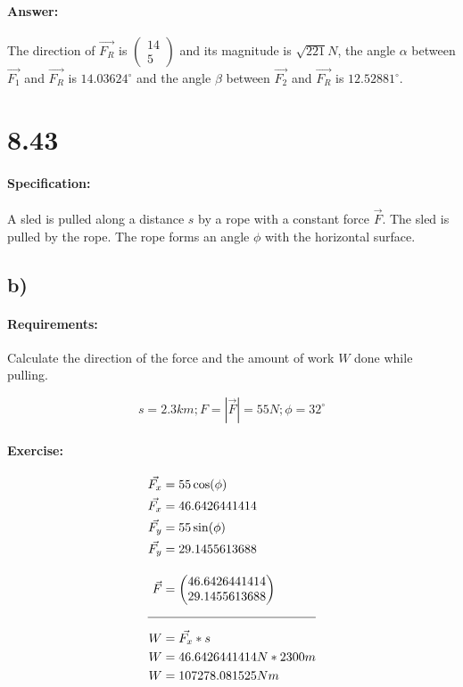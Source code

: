 \documentclass{article}
\begin{document}
\paragraph{Answer:}
The direction of $\vec{F_R}$ is $\begin{pmatrix}
   14 \\ 
   5
\end{pmatrix}$ and its magnitude is $\sqrt{221}N$, the angle $\alpha$ between $\vec{F_1}$ 
and $\vec{F_R}$ is $14.03624^\circ$ and the angle $\beta$ between $\vec{F_2}$ and $\vec{F_R}$ 
is $12.52881^\circ$.

\pagebreak

\section{8.43}
\paragraph{Specification:}
A sled is pulled along a distance $s$ by a rope with a constant force $\vec{F}$. The sled
is pulled by the rope. The rope forms an angle $\phi$ with the horizontal surface.

\subsection{b)}
\paragraph{Requirements:}
Calculate the direction of the force and the amount of work $W$ done while pulling.

\begin{equation}
   s = 2.3km; F = |\vec{F}|  = 55N; \phi = 32^\circ 
\end{equation}

\paragraph{Exercise:}
\begin{align}
    \vec{F_x} &= 55\cos(\phi) \\
    \vec{F_x} &= 46.6426441414 \\
    \vec{F_y} &= 55\sin(\phi) \\
    \vec{F_y} &= 29.1455613688 \\[10pt]
    \vec{F} &= \begin{pmatrix}
        46.6426441414 \\
        29.1455613688 \\ 
    \end{pmatrix} \\[10pt]
    \hline 
    \noalign{\vskip 10pt}
    W &= \vec{F_x} * s \\
    W &= 46.6426441414N * 2300m \\
    W &= 107278.081525 Nm
\end{align}
\end{document}

